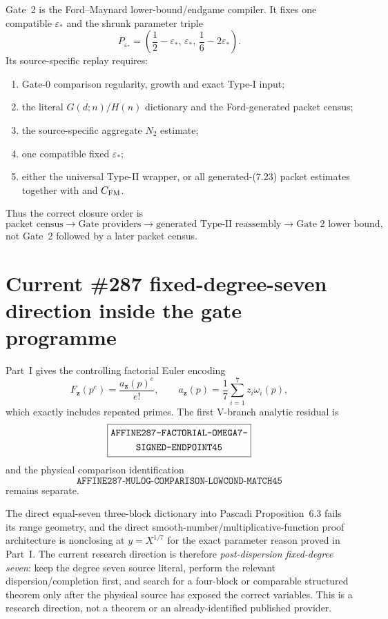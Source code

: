 \documentclass[11pt]{article}
\theoremstyle{definition}
\newcommand{\1}{\mathbf 1}
\begin{document}
{{{Gate~2 is the Ford--Maynard lower-bound/endgame compiler.  It fixes one compatible
$\varepsilon_\ast$ and the shrunk parameter triple
\[
P_{\varepsilon_\ast}
=
\left(
\frac12-\varepsilon_\ast,\,
\varepsilon_\ast,\,
\frac16-2\varepsilon_\ast
\right).
\]
Its source-specific replay requires:
\begin{enumerate}[leftmargin=1.7em]
\item Gate-0 comparison regularity, growth and exact Type-I input;
\item the literal $G(d;n)/H(n)$ dictionary and the Ford-generated packet census;
\item the source-specific aggregate $N_2$ estimate;
\item one compatible fixed $\varepsilon_\ast$;
\item either the universal Type-II wrapper, or all generated-(7.23) packet estimates
  together with  and $C_{\rm FM}$.
\end{enumerate}
Thus the correct closure order is
\[
\text{packet census}
\to
\text{Gate providers}
\to
\text{generated Type-II reassembly}
\to
\text{Gate 2 lower bound},
\]
not Gate~2 followed by a later packet census.

\section{Current \#287 fixed-degree-seven direction inside the gate programme}
\label{sec:fixed-degree-seven-ledger}

Part~I gives the controlling factorial Euler encoding
\[
F_{\mathbf z}(p^e)=\frac{a_{\mathbf z}(p)^e}{e!},
\qquad
a_{\mathbf z}(p)=\frac17\sum_{i=1}^{7}z_i\omega_i(p),
\]
which exactly includes repeated primes.  The first V-branch analytic residual is
\[
\boxed{\begin{gathered}\text{\ttfamily AFFINE287-FACTORIAL-OMEGA7-}\\\text{\ttfamily SIGNED-ENDPOINT45}\end{gathered}}
\]
and the physical comparison identification
\[
\boxed{\texttt{AFFINE287-MULOG-COMPARISON-LOWCOND-MATCH45}}
\]
remains separate.

The direct equal-seven three-block dictionary into Pascadi Proposition~6.3 fails its range
geometry, and the direct smooth-number/multiplicative-function proof architecture is
nonclosing at $y=X^{1/7}$ for the exact parameter reason proved in Part~I.  The current
research direction is therefore \emph{post-dispersion fixed-degree seven}: keep the degree
seven source literal, perform the relevant dispersion/completion first, and search for a
four-block or comparable structured theorem only after the physical source has exposed the
correct variables.  This is a research direction, not a theorem or an already-identified
published provider.

}}}
\end{document}
